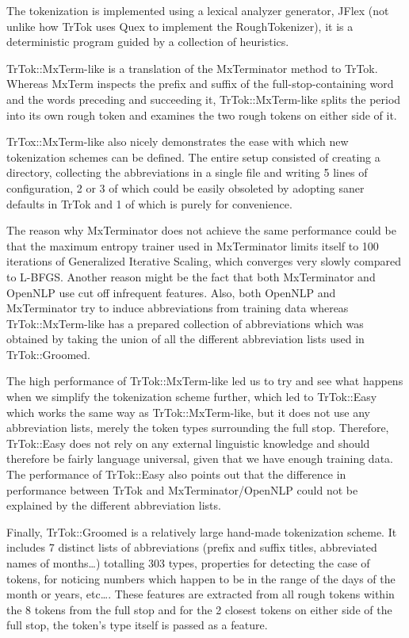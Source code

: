 The tokenization is implemented using a lexical analyzer generator,
JFlex (not unlike how TrTok uses Quex to implement the
RoughTokenizer), it is a deterministic program guided by a collection
of heuristics.

TrTok::MxTerm-like is a translation of the MxTerminator method to
TrTok. Whereas MxTerm inspects the prefix and suffix of the
full-stop-containing word and the words preceding and succeeding it,
TrTok::MxTerm-like splits the period into its own rough token and
examines the two rough tokens on either side of it.

TrTox::MxTerm-like also nicely demonstrates the ease with which new
tokenization schemes can be defined. The entire setup consisted of
creating a directory, collecting the abbreviations in a single file
and writing 5 lines of configuration, 2 or 3 of which could be easily
obsoleted by adopting saner defaults in TrTok and 1 of which is purely
for convenience.

The reason why MxTerminator does not achieve the same performance
could be that the maximum entropy trainer used in MxTerminator limits
itself to 100 iterations of Generalized Iterative Scaling, which
converges very slowly compared to L-BFGS. Another reason might be the
fact that both MxTerminator and OpenNLP use cut off infrequent
features. Also, both OpenNLP and MxTerminator try to induce
abbreviations from training data whereas TrTok::MxTerm-like has a
prepared collection of abbreviations which was obtained by taking the
union of all the different abbreviation lists used in TrTok::Groomed.

The high performance of TrTok::MxTerm-like led us to try and see what
happens when we simplify the tokenization scheme further, which led to
TrTok::Easy which works the same way as TrTok::MxTerm-like, but it
does not use any abbreviation lists, merely the token types
surrounding the full stop. Therefore, TrTok::Easy does not rely on any
external linguistic knowledge and should therefore be fairly language
universal, given that we have enough training data. The performance of
TrTok::Easy also points out that the difference in performance between
TrTok and MxTerminator/OpenNLP could not be explained by the different
abbreviation lists.

Finally, TrTok::Groomed is a relatively large hand-made tokenization
scheme. It includes 7 distinct lists of abbreviations (prefix and
suffix titles, abbreviated names of months\ldots) totalling 303 types,
properties for detecting the case of tokens, for noticing numbers
which happen to be in the range of the days of the month or years,
etc\ldots. These features are extracted from all rough tokens within
the 8 tokens from the full stop and for the 2 closest tokens on either
side of the full stop, the token's type itself is passed as a feature.

